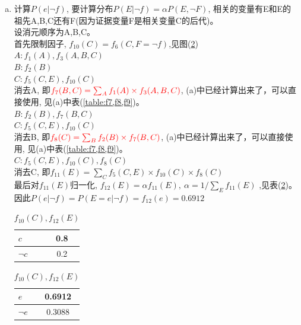 \documentclass[a4paper, 11pt]{article}
\begin{document}
\begin{enumerate}
\begin{enumerate}[(a)]
\begin{table}[!htbp]
        \label{table:f7,f8,f9}
      \end{table}
      \item 计算$P(e|\lnot f)$, 要计算分布$P(E|\lnot f)=\alpha P(E,\lnot F)$,
      相关的变量有E和E的祖先A,B,C还有F(因为证据变量F是相关变量C的后代)。\\
      设消元顺序为A,B,C。\\
      首先限制因子, $f_{10}(C) = f_{6}(C,F=\lnot f)$,见图(\ref{table:f10,f12})\\
      $A: f_{1}(A), f_{3}(A,B,C)$\\
      $B: f_{2}(B)$\\
      $C: f_{5}(C,E),f_{10}(C)$\\
      消去A, 即$\textcolor{red}{f_{7}(B,C) = \sum_{A}f_{1}(A) \times f_{3}(A,B,C)}$, (a)中已经计算出来了，可以直接使用,
      见(a)中表(\ref{table:f7,f8,f9})。\\
      $B: f_{2}(B), f_{7}(B,C)$\\
      $C: f_{5}(C,E),f_{10}(C)$\\
      消去B, 即$\textcolor{red}{f_{8}(C) = \sum_{B}f_{2}(B) \times f_{7}(B,C)}$, (a)中已经计算出来了，可以直接使用,
      见(a)中表(\ref{table:f7,f8,f9})。\\
      $C: f_{5}(C,E),f_{10}(C),f_{8}(C)$\\
      消去C, 即$f_{11}(E) = \sum_{C}f_{5}(C,E)\times f_{10}(C)\times f_{8}(C)$\\
      最后对$f_{11}(E)$归一化, $f_{12}(E) = \alpha f_{11}(E),\ \alpha = 1/\sum_{E}f_{11}(E)$
      ,见表(\ref{table:f10,f12})。
      \\因此$P(e|\lnot f) = P(E=e|\lnot f) = f_{12}(e) = 0.6912$
      \begin{table}[!ht]
        \centering
        \begin{tabular}{|l|c|}
          \hline
          $c$&0.8\\
          \hline
          $\lnot c$&0.2\\
          \hline
        \end{tabular}
        \begin{tabular}{|l|c|}
          \hline
          $e$&0.6912\\
          \hline
          $\lnot e$&0.3088\\
          \hline
        \end{tabular}
        \caption{$f_{10}(C),f_{12}(E)$}
        \label{table:f10,f12}
      \end{table}
    \end{enumerate}
\end{enumerate}



%
%
\end{document}

